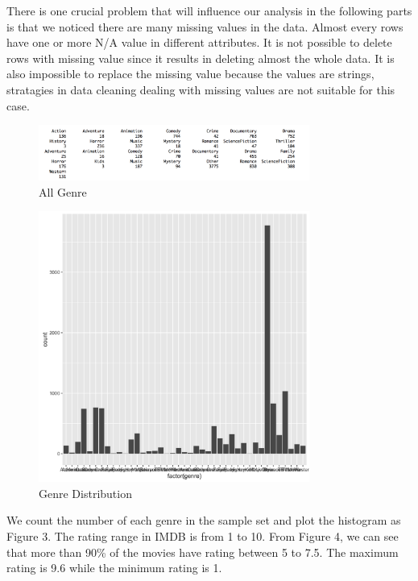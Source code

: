\documentclass[conference]{IEEEtran}
\begin{document}
There is one crucial problem that will influence our analysis in the following parts is that we noticed there are many missing values in the data. Almost every rows have one or more N/A value in different attributes. It is not possible to delete rows with missing value since it results in deleting almost the whole data. It is also impossible to replace the missing value because the values are strings, stratagies in data cleaning dealing with missing values are not suitable for this case.


\begin{figure}
	\centering
	\includegraphics[width=3.5in]{genre_count}
	\caption{All Genre}
	\label{fig:side:a}
\end{figure}

\begin{figure}
	\centering
	\includegraphics[width=3.5in]{genre_dis.png}
	\caption{Genre Distribution}
	\label{fig:side:a}
\end{figure}

We count the number of each genre in the sample set and plot the histogram as Figure 3. The rating range in IMDB is from 1 to 10. From Figure 4, we can see that more than 90\% of the movies have rating between 5 to 7.5. The maximum rating is 9.6 while the minimum rating is 1.
\end{document}
